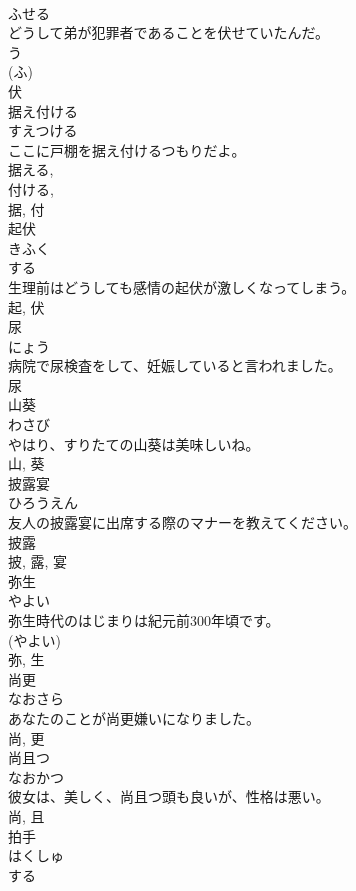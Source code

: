 \documentclass[8pt]{extreport}
\begin{document}
\begin{CJK}{UTF8}{min}
\\	ふせる	
\\	どうして弟が犯罪者であることを伏せていたんだ。	
\\	う 
\\	(ふ) 
\\	伏	
\\	据え付ける	
\\	すえつける	
\\	ここに戸棚を据え付けるつもりだよ。	
\\	据える, 
\\	付ける, 
\\	据, 付	
\\	起伏	
\\	きふく	
\\	する 
\\	生理前はどうしても感情の起伏が激しくなってしまう。	
\\	起, 伏	
\\	尿	
\\	にょう	
\\	病院で尿検査をして、妊娠していると言われました。	
\\	尿	
\\	山葵	
\\	わさび	
\\	やはり、すりたての山葵は美味しいね。	
\\	山, 葵	
\\	披露宴	
\\	ひろうえん	
\\	友人の披露宴に出席する際のマナーを教えてください。	
\\	披露 
\\	披, 露, 宴	
\\	弥生	
\\	やよい	
\\	弥生時代のはじまりは紀元前300年頃です。	
\\	(やよい) 
\\	弥, 生	
\\	尚更	
\\	なおさら	
\\	あなたのことが尚更嫌いになりました。	
\\	尚, 更	
\\	尚且つ	
\\	なおかつ	
\\	彼女は、美しく、尚且つ頭も良いが、性格は悪い。	
\\	尚, 且	
\\	拍手	
\\	はくしゅ	
\\	する 

\end{CJK}
\end{document}
